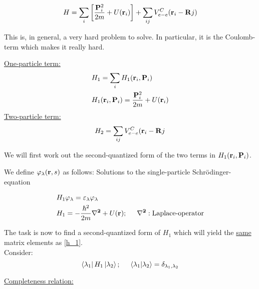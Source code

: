 \begin{equation}
	H = \sum_i \left[\frac{\vb{P}_i^2}{2m} + U(\vb{r}_i)  \right]+ \sum_{ij} V_{e-e}^C (\vb{r}_i-\vb{R}j)
\end{equation}

\noindent This is, in general, a very hard problem to solve. In particular, it is the Coulomb-term which makes it really hard.\\
\linebreak

\noindent\uline{One-particle term:}
\begin{align}
	&H_1 = \sum_i H_1 (\vb{r}_i, \vb{P}_i)\\
	&H_1 (\vb{r}_i, \vb{P}_i) = \frac{\vb{P}_i^2}{2m} + U(\vb{r}_i)
\end{align}
\linebreak
\noindent \uline{Two-particle term:}
\begin{equation}
	H_2 = \sum_{ij} V_{e-e}^C (\vb{r}_i-\vb{R}j
\end{equation}

\noindent We will first work out the second-quantized form of the two terms in $H_1 (\vb{r}_i, \vb{P}_i)$. \\
\linebreak

\noindent We define $\varphi_\lambda ( \vb{r},s)$ as follows:
Solutions to the single-particle Schrödinger-equation

\begin{align}
	&H_1 \varphi_\lambda = \varepsilon_\lambda \varphi_\lambda\\
	&H_1 = -\frac{\hbar^2}{2m} \vb{\laplacian} + U(\vb{r}) ; \hspace{0.5cm} \vb{\laplacian} : \text{Laplace-operator} \label{h_1}
\end{align}

\noindent The task is now to find a second-quantized form of $H_1$ which will yield the \uline{same} matrix elements as \ref{h_1}.\\
\linebreak
\noindent Consider:
\begin{equation}
	\bra{\lambda_1} H_1 \ket{\lambda_2} ; \hspace{0.5cm} \braket{\lambda_1}{\lambda_2} = \delta_{\lambda_1, \lambda_2}
\end{equation}

\noindent \uline{Completeness relation:}

